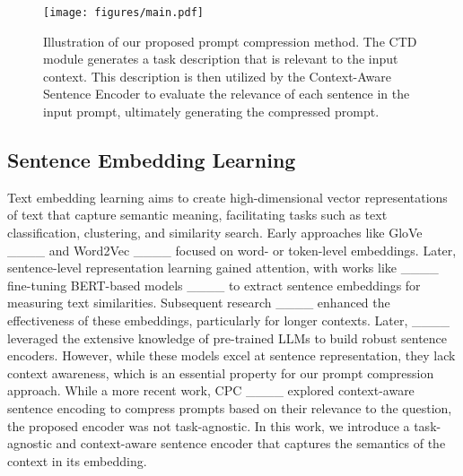 \begin{figure*}
    \centering
    \texttt{[image: figures/main.pdf]}
    \caption{Illustration of our proposed prompt compression method. The CTD module generates a task description that is relevant to the input context. This description is then utilized by the Context-Aware Sentence Encoder to evaluate the relevance of each sentence in the input prompt, ultimately generating the compressed prompt.}
    \label{fig:main}
\end{figure*}



\subsection{Sentence Embedding Learning}
Text embedding learning aims to create high-dimensional vector representations of text that capture semantic meaning, facilitating tasks such as text classification, clustering, and similarity search. Early approaches like GloVe ____ and Word2Vec ____ focused on word- or token-level embeddings. Later, sentence-level representation learning gained attention, with works like ____ fine-tuning BERT-based models ____ to extract sentence embeddings for measuring text similarities. Subsequent research ____ enhanced the effectiveness of these embeddings, particularly for longer contexts. Later, ____ leveraged the extensive knowledge of pre-trained LLMs to build robust sentence encoders. However, while these models excel at sentence representation, they lack context awareness, which is an essential property for our prompt compression approach. While a more recent work, CPC ____ explored context-aware sentence encoding to compress prompts based on their relevance to the question, the proposed encoder was not task-agnostic. In this work, we introduce a task-agnostic and context-aware sentence encoder that captures the semantics of the context in its embedding.
